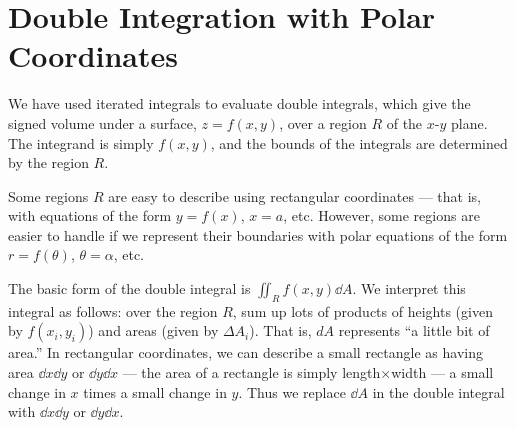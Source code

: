 \section{Double Integration with Polar Coordinates}\label{sec:double_int_polar}

We have used iterated integrals to evaluate double integrals, which give the signed volume under a surface, $z=f(x,y)$, over a region $R$ of the $x$-$y$ plane. The integrand is simply $f(x,y)$, and the bounds of the integrals are determined by the region $R$.

Some regions $R$ are easy to describe using rectangular coordinates --- that is, with equations of the form $y=f(x)$, $x=a$, etc. However, some regions are easier to handle if we represent their boundaries with polar equations of the form $r=f(\theta)$, $\theta = \alpha$, etc. 

The basic form of the double integral is $\iint_R f(x,y)\dd A$. We interpret this integral as follows: over the region $R$, sum up lots of products of heights (given by $f(x_i,y_i)$) and areas (given by $\Delta A_i$). That is, $dA$ represents ``a little bit of area.'' In rectangular coordinates, we can describe a small rectangle as having area $\dd x\dd y$ or $\dd y\dd x$ --- the area of a rectangle is simply length$\times$width --- a small change in $x$ times a small change in $y$. Thus we replace $\dd A$ in the double integral with $\dd x\dd y$ or $\dd y\dd x$.


